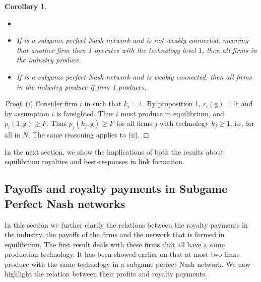 \documentclass{article}
\newtheorem{corollary}{Corollary}
\begin{document}
 \begin{corollary}\label{connectednessproperties}
 \begin{itemize}
     \item[]
     \item[(i)] If  is a subgame perfect Nash network and  is not weakly connected, meaning that another firm than 1 operates with the technology level $1$, then all firms in the industry produce. 
     \item[(ii)] If  is a subgame perfect Nash network and  is weakly connected, then all firms in the industry produce if firm 1 produces. 
\end{itemize}
 \end{corollary}
 \begin{proof}
 (i) Consider firm $i$ in  such that $k_i=1$. By proposition 1, $r_i(\text{g})=0$; and by assumption $i$ is farsighted. Thus $i$ must produce in equilibrium, and $p_i(1,\text{g})\geq F$. Thus $p_j(k_j,\text{g})\geq F$ for all firms $j$ with technology $k_j\geq 1$, i.e. for all in $N$. The same reasoning applies to (ii).   
 \end{proof}
 
 In the next section, we show the implications of both the results about equilibrium royalties and best-responses in link formation. 
 
 \subsection{Payoffs and royalty payments in Subgame Perfect Nash networks}
 
In this section we further clarify the relations between the royalty payments in the industry, the payoffs of the firms and the network that is formed in equilibrium. The first result deals with these firms that all have a same production technology. It has been showed earlier on that at most two firms produce with the same technology in a subgame perfect Nash network. We now highlight the relation between their profits and royalty payments. \\
\end{document}
